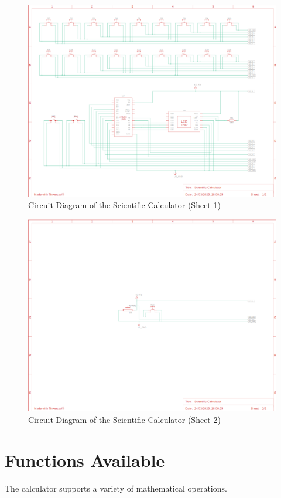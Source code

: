 \documentclass[a4paper,12pt]{article}
\begin{document}
\begin{figure}[H]
    \centering
    \includegraphics[width=\textwidth]{figs/circuit1.png}
    \caption{Circuit Diagram of the Scientific Calculator (Sheet 1)}
    \label{fig:circuit1}
\end{figure}

\begin{figure}[H]
    \centering
    \includegraphics[width=\textwidth]{figs/circuit2.png}
    \caption{Circuit Diagram of the Scientific Calculator (Sheet 2)}
    \label{fig:circuit2}
\end{figure}

\section{Functions Available}
The calculator supports a variety of mathematical operations.
\end{document}
